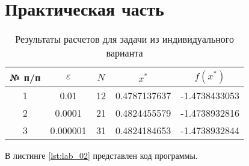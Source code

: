 \documentclass{bmstu}
\begin{document}


\chapter{Практическая часть}

\begin{table}[H]
    \centering
	\caption{Результаты расчетов для задачи из индивидуального варианта}
    \label{tbl:task}
	\begin{tabular}{|c|c|c|c|c|}
        \hline
        № п/п & $\varepsilon$ & $N$ & $x^*$ & $f(x^*)$ \\ \hline
        1 & 0.01 & 12 & 0.4787137637 & -1.4738433053 \\ \hline
        2 & 0.0001 & 21 & 0.4824455579 & -1.4738932816 \\ \hline
        3 & 0.000001 & 31 & 0.4824184653 & -1.4738932844 \\ \hline
    \end{tabular}
\end{table}

В листинге \ref{lst:lab_02} представлен код программы.

\end{document}
